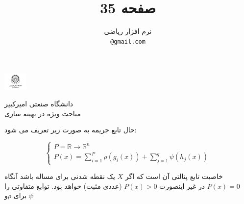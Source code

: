 \documentclass[A4]{article}
\title{صفحه 35}
\author{%

  نرم افزار ریاضی\\

  \texttt{@gmail.com} \\
}
\begin{document}
\baselineskip=0.7cm

\begin{minipage}{0.1\textwidth}%
\includegraphics[width=1.2cm]{Amirkabir.jpg}
\end{minipage}%
\hfill%
\begin{minipage}{0.9\textwidth}\raggedleft
دانشگاه صنعتی امیرکبیر\\
مباحث ویژه در بهینه سازی\\
\end{minipage}

\makepertitle

حال تابع جریمه به صورت زیر تعریف می شود:\\

\begin{flushleft}
\[
\begin{cases}
    P= \mathbb {R} \to \mathbb{R} ^n\\
    P(x)= \sum_{i=1}^{P}  \rho(g_i(x)) + \sum_{j=1}^{q} \psi(h_j(x)) 
   
\end{cases}
\]

\end{flushleft}


خاصیت تابع پنالتی آن است که اگر 
$X$
یک نقطه شدنی برای مساله باشد آنگاه 
$P(x)=0$
در غیر اینصورت 
$P(x)>0$
(عددی مثبت)
خواهد بود.
توابع متفاوتی را برای
$\rho$و
$\psi$
\end{document}
